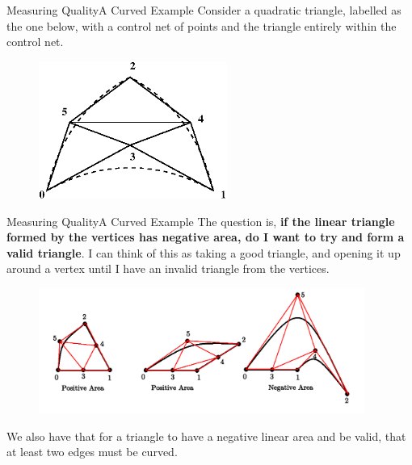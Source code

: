 \documentclass[12pt]{beamer}
\newcommand{\spa}{\vspace{0.5cm}\newline}
\begin{document}
\begin{frame}{Measuring Quality}{A Curved Example}
Consider a quadratic triangle, labelled as the one below, with a control net of points and the triangle entirely within the control net.
\begin{figure}
  \centering
  \includegraphics[width=0.55\textwidth]{bezier_images/q1.png} 
\end{figure}
\end{frame}

\begin{frame}{Measuring Quality}{A Curved Example}
The question is, {\bf if the linear triangle formed by the vertices has negative area, do I want to try and form a valid triangle}. \spa
I can think of this as taking a good triangle, and opening it up around a vertex until I have an invalid triangle from the vertices.
\begin{figure}
  \centering
  \includegraphics[width=0.95\textwidth]{bezier_images/q6.png} 
\end{figure}
We also have that for a triangle to have a negative linear area and be valid, that at least two edges must be curved.
\end{frame}
\end{document}
